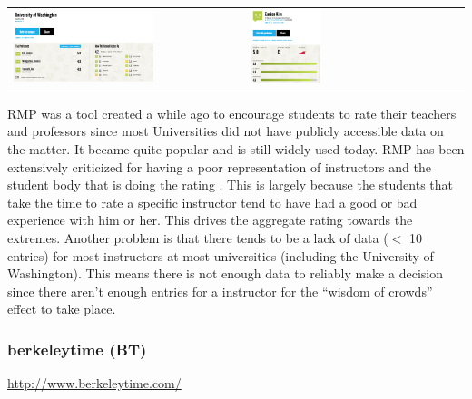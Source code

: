 \documentclass{article}
\begin{document}
\vspace{-7 pt}
\begin{center}
\begin{tabular}{ll}
    \includegraphics[width=0.62\textwidth]{rmp.png}
    &
    \includegraphics[width=0.33\textwidth]{rmp_2.png}
\end{tabular}
\end{center}

RMP was a tool created a while ago to encourage students to rate their teachers and professors since most Universities did not have publicly accessible data on the matter. It became quite popular and is still widely used today. RMP has been extensively criticized for having a poor representation of instructors and the student body that is doing the rating \cite{coladarci2007ratemyprofessors,felton2008attractiveness,sonntag2009empirical}. This is largely because the students that take the time to rate a specific instructor tend to have had a good or bad experience with him or her. This drives the aggregate rating towards the extremes. Another problem is that there tends to be a lack of data ($<$ 10 entries) for most instructors at most universities (including the University of Washington). This means there is not enough data to reliably make a decision since there aren't enough entries for a instructor for the ``wisdom of crowds'' effect to take place.

\subsubsection*{berkeleytime (BT) \cite{berkeleytime}}
{\color{blue} \href{http://www.berkeleytime.com/}{http://www.berkeleytime.com/}}
\end{document}

